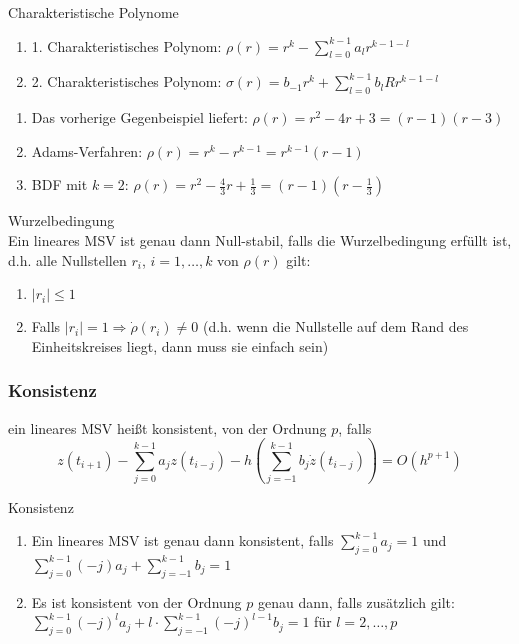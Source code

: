 \begin{definition}
	[Definition IV.9] Charakteristische Polynome
	\\
	\begin{enumerate}
		\item 1. Charakteristisches Polynom: $\rho(r)=r^{k}-\sum_{l=0}^{k-1}a_{l}r^{k-1-l}$
		\item 2. Charakteristisches Polynom: $\sigma(r)=b_{-1}r^{k}+\sum_{l=0}^{k-1}b_{l}Rr^{k-1-l}$
	\end{enumerate}
\end{definition}


\begin{example}
	\begin{enumerate}
		\item Das vorherige Gegenbeispiel liefert: $\rho(r)=r^{2}-4r+3=(r-1)(r-3)$
		\item Adams-Verfahren: $\rho(r)=r^{k}-r^{k-1}=r^{k-1}(r-1)$
		\item BDF mit $k=2$: $\rho(r)=r^{2}-\frac{4}{3}r+\frac{1}{3} = (r-1)(r-\frac{1}{3})$
	\end{enumerate}
\end{example}

\begin{theorem}
	Wurzelbedingung
	\\
	Ein lineares MSV ist genau dann Null-stabil, falls die Wurzelbedingung erfüllt ist, d.h. alle Nullstellen $r_{i}$, $i=1,\ldots,k$
	von $\rho(r)$ gilt:
	\begin{enumerate}
		\item $|r_{i}|\le 1$
		\item Falls $|r_{i}|=1\Rightarrow \dot \rho(r_{i})\not = 0$ (d.h. wenn die Nullstelle auf dem Rand des Einheitskreises liegt, dann muss sie einfach sein)
	\end{enumerate}
\end{theorem}

\subsubsection{Konsistenz}
\begin{definition}
	[Definition IV.10] ein lineares MSV heißt konsistent, von der Ordnung $p$, falls 
	$$z(t_{i+1})-\sum_{j=0}^{k-1}a_{j}z(t_{i-j})-h(\sum_{j=-1}^{k-1}b_{j}\dot z(t_{i-j}))=O(h^{p+1})$$
\end{definition}

\begin{theorem}
	Konsistenz
	\\
	\begin{enumerate}
		\item Ein lineares MSV ist genau dann konsistent, falls $\sum_{j=0}^{k-1}a_{j}=1$ und $\sum_{j=0}^{k-1}(-j)a_{j}+\sum_{j=-1}^{k-1}b_{j}=1$
		\item Es ist konsistent von der Ordnung $p$ genau dann, falls zusätzlich gilt: $\sum_{j=0}^{k-1}(-j)^{l}a_{j}+l\cdot \sum_{j=-1}^{k-1}(-j)^{l-1}b_{j}=1$ für $l=2,\ldots,p$
	\end{enumerate}
\end{theorem}

